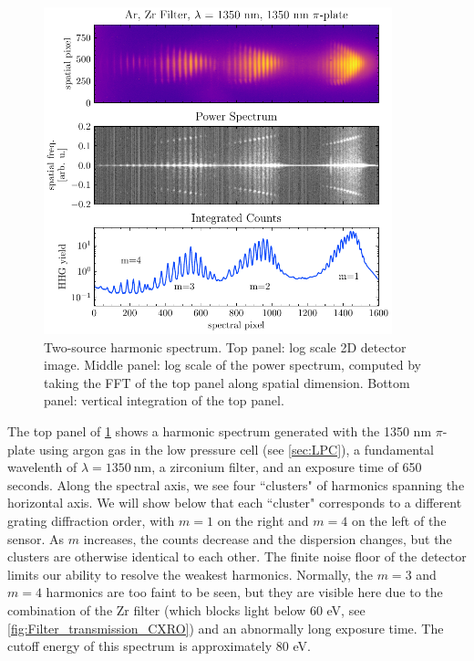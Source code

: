\begin{figure}
	\centering
	\includegraphics[width=0.9\textwidth]{figures/chap2/multi-order-PiPlate.pdf}
	\caption{Two-source harmonic spectrum. Top panel: log scale 2D detector image. Middle panel: log scale of the power spectrum, computed by taking the FFT of the top panel along spatial dimension. Bottom panel: vertical integration of the top panel.}
	\label{fig:multi-order-PiPlate}
\end{figure}

The top panel of \cref{fig:multi-order-PiPlate} shows a harmonic spectrum generated with the 1350 nm $\pi$-plate using argon gas in the low pressure cell (see \cref{sec:LPC}), a fundamental wavelenth of $\lambda=1350 \ \textrm{nm}$, a zirconium filter, and an exposure time of 650 seconds. Along the spectral axis, we see four ``clusters" of harmonics spanning the horizontal axis. We will show below that each ``cluster" corresponds to a different grating diffraction order, with $m=1$ on the right and $m=4$ on the left of the sensor. As $m$ increases, the counts decrease and the dispersion changes, but the clusters are otherwise identical to each other. The finite noise floor of the detector limits our ability to resolve the weakest harmonics. Normally, the $m=3$ and $m=4$ harmonics are too faint to be seen, but they are visible here due to the combination of the Zr filter (which blocks light below 60 eV, see \cref{fig:Filter_transmission_CXRO}) and an abnormally long exposure time. The cutoff energy of this spectrum is approximately 80 eV.

